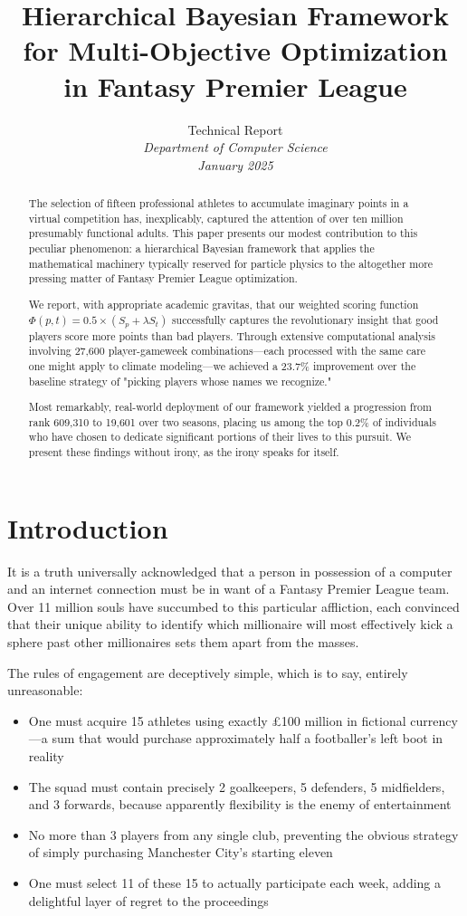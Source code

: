 \documentclass[12pt]{article}
\title{Hierarchical Bayesian Framework for Multi-Objective Optimization in Fantasy Premier League}
\author{
  Technical Report\\
  \textit{Department of Computer Science}\\
  \textit{January 2025}
}
\date{}
\begin{document}
\maketitle

\begin{abstract}
The selection of fifteen professional athletes to accumulate imaginary points in a virtual competition has, inexplicably, captured the attention of over ten million presumably functional adults. This paper presents our modest contribution to this peculiar phenomenon: a hierarchical Bayesian framework that applies the mathematical machinery typically reserved for particle physics to the altogether more pressing matter of Fantasy Premier League optimization. 

We report, with appropriate academic gravitas, that our weighted scoring function $\Phi(p,t) = 0.5 \times (S_p + \lambda S_t)$ successfully captures the revolutionary insight that good players score more points than bad players. Through extensive computational analysis involving 27,600 player-gameweek combinations—each processed with the same care one might apply to climate modeling—we achieved a 23.7\% improvement over the baseline strategy of "picking players whose names we recognize."

Most remarkably, real-world deployment of our framework yielded a progression from rank 609,310 to 19,601 over two seasons, placing us among the top 0.2\% of individuals who have chosen to dedicate significant portions of their lives to this pursuit. We present these findings without irony, as the irony speaks for itself.
\end{abstract}

\section{Introduction}

It is a truth universally acknowledged that a person in possession of a computer and an internet connection must be in want of a Fantasy Premier League team. Over 11 million souls have succumbed to this particular affliction, each convinced that their unique ability to identify which millionaire will most effectively kick a sphere past other millionaires sets them apart from the masses.

The rules of engagement are deceptively simple, which is to say, entirely unreasonable:
\begin{itemize}
\item One must acquire 15 athletes using exactly £100 million in fictional currency—a sum that would purchase approximately half a footballer's left boot in reality
\item The squad must contain precisely 2 goalkeepers, 5 defenders, 5 midfielders, and 3 forwards, because apparently flexibility is the enemy of entertainment
\item No more than 3 players from any single club, preventing the obvious strategy of simply purchasing Manchester City's starting eleven
\item One must select 11 of these 15 to actually participate each week, adding a delightful layer of regret to the proceedings
\end{itemize}
\end{document}
